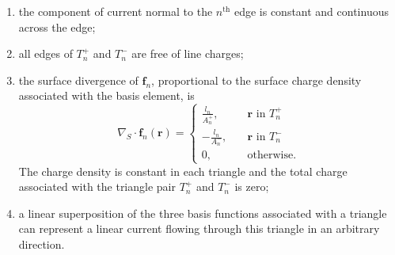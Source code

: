 \documentclass[a4paper,10pt]{book}
\newcommand{\vect}[1]{\mathbf{#1}}
\renewcommand{\arg}[1]{\ensuremath{\!\left(#1\right)}}
\begin{document}
\begin{enumerate}
\item the component of current normal to the $n^\text{th}$ edge is constant and continuous across the edge;
\item all edges of $T_n^+$ and $T_n^-$ are free of line charges;
\item the surface divergence of $\vect{f}_n$, proportional to the surface charge density associated with the basis element, is
\begin{equation} \label{eqn:RWG divergence}
\nabla_S \cdot \vect{f}_n \arg{\vect{r}} =
\begin{cases}
\frac{l_n}{A_n^+}, & \quad \text{$\vect{r}$ in $T_n^+$} \\
-\frac{l_n}{A_n^-}, & \quad \text{$\vect{r}$ in $T_n^-$} \\
0, & \quad \text{otherwise}.
\end{cases}
\end{equation}
The charge density is constant in each triangle and the total charge associated with the triangle pair $T_n^+$ and $T_n^-$ is zero;
\item a linear superposition of the three basis functions associated with a triangle can represent a linear current flowing through this triangle in an arbitrary direction.
\end{enumerate}
\end{document}
